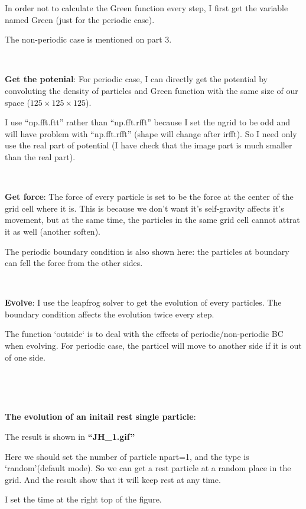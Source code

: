 \documentclass[showpacs, oneside, onecolumn, prl, amsmath, amssymb, nofootinbib, superscriptaddress, notitlepage]{revtex4-1}
\begin{document}
In order not to calculate the Green function every step, I first get the variable named Green (just for the periodic case).

The non-periodic case is mentioned on part 3.

~~~~

\textbf{Get the potenial}: For periodic case, I can directly get the potential by convoluting the density of particles and Green function with the same size of our space ($125\times125\times125$).

I use ``np.fft.ftt'' rather than ``np.fft.rfft'' because I set the ngrid to be odd and will have problem with ``np.fft.rfft'' (shape will change after irfft). So I need only use the real part of potential (I have check that the image part is much smaller than the real part).

~~~~

\textbf{Get force}: The force of every particle is set to be the force at the center of the grid cell where it is. This is because we don't want it's self-gravity affects it's movement, but at the same time, the particles in the same grid cell cannot attrat it as well (another soften).

The periodic boundary condition is also shown here: the particles at boundary can fell the force from the other sides.

~~~~

\textbf{Evolve}: I use the leapfrog solver to get the evolution of every particles. The boundary condition affects the evolution twice every step.

The function `outside` is to deal with the effects of periodic/non-periodic BC when evolving. For periodic case, the particel will move to another side if it is out of one side.

~~~~

~~~~

\textbf{The evolution of an initail rest single particle}:

The result is shown in \textbf{``JH\_1.gif''}

Here we should set the number of particle npart=1, and the type is `random'(default mode). So we can get a rest particle at a random place in the grid. And the result show that it will keep rest at any time.

I set the time at the right top of the figure.

~~~~

~~~~

\end{document}
